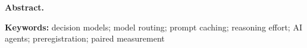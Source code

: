 \begin{center}\begin{minipage}{0.93\textwidth}\small
\noindent\textbf{Abstract.} 
\par\smallskip\noindent\textbf{Keywords:} decision models; model routing; prompt caching; reasoning effort; AI agents;
preregistration; paired measurement
\end{minipage}\end{center}
